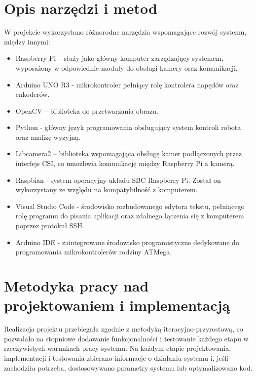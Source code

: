 \section{Opis narzędzi i metod}
W projekcie wykorzystano różnorodne narzędzia wspomagające rozwój systemu, między innymi:

\begin{itemize}
    \item Raspberry Pi – służy jako główny komputer zarządzający systemem, wyposażony w odpowiednie moduły do obsługi kamery oraz komunikacji.
    \item Arduino UNO R3 - mikrokontroler pełniący rolę kontrolera napędów oraz enkoderów. 
    \item OpenCV – biblioteka do przetwarzania obrazu. 
    \item Python - główny język programowania obsługujący system kontroli robota oraz analizę wyzyjną. 
    \item Libcamera2 – biblioteka wspomagająca obsługę kamer podłączonych przez interfejs CSI, co umożliwia komunikację między Raspberry Pi a kamerą.
    \item Raspbian - system operacyjny układu SBC Raspberry Pi. Został on wykorzystany ze względu na kompatybilność z komputerem. 
    \item Visual Studio Code - środowisko rozbudowanego edytora tekstu, pełniącego rolę programu do pisania aplikacji oraz zdalnego łączenia się z komputerem poprzez protokuł SSH. 
    \item Arduino IDE - zaintegrowane środowisko programistyczne dedykowane do programowania mikrokontrolerów rodziny ATMega. 
\end{itemize}


\section{Metodyka pracy nad projektowaniem i implementacją}
Realizacja projektu przebiegała zgodnie z metodyką iteracyjno-przyrostową, co pozwalało na stopniowe dodawanie funkcjonalności i testowanie każdego etapu w rzeczywistych warunkach pracy systemu. Na każdym etapie projektowania, implementacji i testowania zbierano informacje o działaniu systemu i, jeśli zachodziła potrzeba, dostosowywano parametry systemu lub optymalizowano kod.